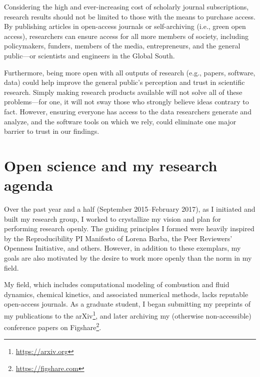 \documentclass[nobib]{tufte-handout}
\begin{document}
Considering the high and ever-increasing cost of scholarly journal subscriptions,
research results should not be limited to those with the means to purchase access.
By publishing articles in open-access journals or self-archiving (i.e., green open
access), researchers can ensure access for all more members of society, including
policymakers, funders, members of the media, entrepreneurs, and the general
public---or scientists and engineers in the Global South.

Furthermore, being more open with all outputs of research (e.g., papers, software,
data) could help improve the general public's perception and trust in
scientific research. Simply making research products available will not solve
all of these problems---for one, it will not sway those who strongly believe
ideas contrary to fact. However, ensuring everyone has access to the data researchers
generate and analyze, and the software tools on which we rely, could eliminate one
major barrier to trust in our findings\autocite{Grand:2012}.

\section{Open science and my research agenda}
\label{sec:agenda}

Over the past year and a half (September 2015--February 2017), as I initiated
and built my research group, I worked to crystallize my vision and plan for
performing research openly. The guiding principles I formed were heavily
inspired by the Reproducibility PI Manifesto of Lorena Barba\autocite{Barba:2012pi},
the Peer Reviewers' Openness Initiative\autocite{Morey150547}, and others.
However, in addition to these exemplars, my goals are also motivated by the desire
to work more openly than the norm in my field.

My field, which includes computational modeling of combustion and fluid dynamics,
chemical kinetics, and associated numerical methods, lacks reputable open-access
journals. As a graduate student, I began submitting my preprints of my publications
to the arXiv\footnote{\url{https://arxiv.org}}, and later archiving my
(otherwise non-accessible) conference papers on
Figshare\footnote{\url{https://figshare.com}}.
\end{document}

